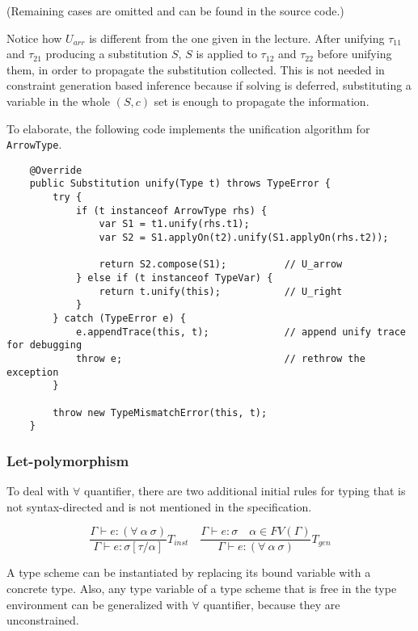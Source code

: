 \documentclass[a4paper]{article}
\begin{document}
\begin{center}
    (Remaining cases are omitted and can be found in the source code.)
\end{center}

Notice how $U_{arr}$ is different from the one given in the lecture. After unifying $\tau_{11}$ and $\tau_{21}$ producing a substitution $S$, $S$ is applied to $\tau_{12}$ and $\tau_{22}$ before unifying them, in order to propagate the substitution collected. This is not needed in constraint generation based inference because if solving is deferred, substituting a variable in the whole $(S, c)$ set is enough to propagate the information.

To elaborate, the following code implements the unification algorithm for \texttt{ArrowType}.

\begin{verbatim}
    @Override
    public Substitution unify(Type t) throws TypeError {
        try {
            if (t instanceof ArrowType rhs) {
                var S1 = t1.unify(rhs.t1);
                var S2 = S1.applyOn(t2).unify(S1.applyOn(rhs.t2));

                return S2.compose(S1);          // U_arrow
            } else if (t instanceof TypeVar) {
                return t.unify(this);           // U_right
            }
        } catch (TypeError e) {
            e.appendTrace(this, t);             // append unify trace for debugging
            throw e;                            // rethrow the exception
        }

        throw new TypeMismatchError(this, t);
    }
\end{verbatim}

\subsubsection{Let-polymorphism}

To deal with $\forall$ quantifier, there are two additional initial rules for typing that is not syntax-directed and is not mentioned in the specification.

\[
    \frac{\Gamma \vdash e: (\forall\ \alpha\ \sigma)}{\Gamma \vdash e: \sigma[\tau/\alpha]}T_{inst}
    \quad
    \frac{\Gamma \vdash e: \sigma \quad \alpha \in FV(\Gamma)}{\Gamma \vdash e: (\forall\ \alpha\ \sigma)}T_{gen}
\]

A type scheme can be instantiated by replacing its bound variable with a concrete type.
Also, any type variable of a type scheme that is free in the type environment can be generalized with $\forall$ quantifier, because they are unconstrained.
\end{document}
